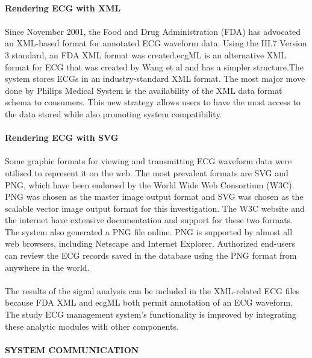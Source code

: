 \documentclass[12pt]{article}
\begin{document}
\paragraph{\textbf{Rendering ECG with XML}}
\paragraph{}Since November 2001, the Food and Drug Administration (FDA) has advocated an XML-based format for annotated ECG waveform data. Using the HL7 Version 3 standard, an FDA XML format was created.ecgML is an alternative XML format for ECG that was created by Wang et al and has a simpler structure.The system stores ECGs in an industry-standard XML format. The most major move done by Philips Medical System is the availability of the XML data format schema to consumers. This new strategy allows users to have the most access to the data stored while also promoting system compatibility.
\paragraph{\textbf{Rendering ECG with SVG}}
\paragraph{}Some graphic formats for viewing and transmitting ECG waveform data were utilised to represent it on the web. The most prevalent formats are SVG and PNG, which have been endorsed by the World Wide Web Consortium (W3C). PNG was chosen as the master image output format and SVG was chosen as the scalable vector image output format for this investigation. The W3C website and the internet have extensive documentation and support for these two formats.\\The system also generated a PNG file online. PNG is supported by almost all web browsers, including Netscape and Internet Explorer. Authorized end-users can review the ECG records saved in the database using the PNG format from anywhere in the world.
\paragraph{}The results of the signal analysis can be included in the XML-related ECG files because FDA XML and ecgML both permit annotation of an ECG waveform. The study ECG management system's functionality is improved by integrating these analytic modules with other components.
\paragraph{\textbf{SYSTEM COMMUNICATION}}
\end{document}
